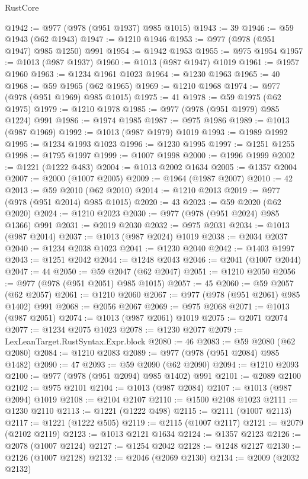 \begin{lexlean}{RustCore}
\begin{coremodule}
@1942 := @977 (@978 (@951 @1937) @985 @1015)
@1943 := 39
@1946 := @59 @1943 (@62 @1943)
@1947 := @1210 @1946
@1953 := @977 (@978 (@951 @1947) @985 @1250) @991
@1954 := @1942 @1953
@1955 := @975 @1954
@1957 := @1013 (@987 @1937)
@1960 := @1013 (@987 @1947) @1019
@1961 := @1957 @1960
@1963 := @1234 @1961 @1023
@1964 := @1230 @1963
@1965 := 40
@1968 := @59 @1965 (@62 @1965)
@1969 := @1210 @1968
@1974 := @977 (@978 (@951 @1969) @985 @1015)
@1975 := 41
@1978 := @59 @1975 (@62 @1975)
@1979 := @1210 @1978
@1985 := @977 (@978 (@951 @1979) @985 @1224) @991
@1986 := @1974 @1985
@1987 := @975 @1986
@1989 := @1013 (@987 @1969)
@1992 := @1013 (@987 @1979) @1019
@1993 := @1989 @1992
@1995 := @1234 @1993 @1023
@1996 := @1230 @1995
@1997 := @1251 @1255
@1998 := @1795 @1997
@1999 := @1007 @1998
@2000 := @1996 @1999
@2002 := @1221 (@1222 @483)
@2004 := @1013 @2002 @1634
@2005 := @1357 @2004
@2007 := @2000 (@1007 @2005)
@2009 := @1964 (@1987 @2007)
@2010 := 42
@2013 := @59 @2010 (@62 @2010)
@2014 := @1210 @2013
@2019 := @977 (@978 (@951 @2014) @985 @1015)
@2020 := 43
@2023 := @59 @2020 (@62 @2020)
@2024 := @1210 @2023
@2030 := @977 (@978 (@951 @2024) @985 @1366) @991
@2031 := @2019 @2030
@2032 := @975 @2031
@2034 := @1013 (@987 @2014)
@2037 := @1013 (@987 @2024) @1019
@2038 := @2034 @2037
@2040 := @1234 @2038 @1023
@2041 := @1230 @2040
@2042 := @1403 @1997
@2043 := @1251 @2042
@2044 := @1248 @2043
@2046 := @2041 (@1007 @2044)
@2047 := 44
@2050 := @59 @2047 (@62 @2047)
@2051 := @1210 @2050
@2056 := @977 (@978 (@951 @2051) @985 @1015)
@2057 := 45
@2060 := @59 @2057 (@62 @2057)
@2061 := @1210 @2060
@2067 := @977 (@978 (@951 @2061) @985 @1402) @991
@2068 := @2056 @2067
@2069 := @975 @2068
@2071 := @1013 (@987 @2051)
@2074 := @1013 (@987 @2061) @1019
@2075 := @2071 @2074
@2077 := @1234 @2075 @1023
@2078 := @1230 @2077
@2079 := LexLeanTarget.RustSyntax.Expr.block
@2080 := 46
@2083 := @59 @2080 (@62 @2080)
@2084 := @1210 @2083
@2089 := @977 (@978 (@951 @2084) @985 @1482)
@2090 := 47
@2093 := @59 @2090 (@62 @2090)
@2094 := @1210 @2093
@2100 := @977 (@978 (@951 @2094) @985 @1402) @991
@2101 := @2089 @2100
@2102 := @975 @2101
@2104 := @1013 (@987 @2084)
@2107 := @1013 (@987 @2094) @1019
@2108 := @2104 @2107
@2110 := @1500 @2108 @1023
@2111 := @1230 @2110
@2113 := @1221 (@1222 @498)
@2115 := @2111 (@1007 @2113)
@2117 := @1221 (@1222 @505)
@2119 := @2115 (@1007 @2117)
@2121 := @2079 (@2102 @2119)
@2123 := @1013 @2121 @1634
@2124 := @1357 @2123
@2126 := @2078 (@1007 @2124)
@2127 := @1254 @2042
@2128 := @1248 @2127
@2130 := @2126 (@1007 @2128)
@2132 := @2046 (@2069 @2130)
@2134 := @2009 (@2032 @2132)

\end{coremodule}
\end{lexlean}
